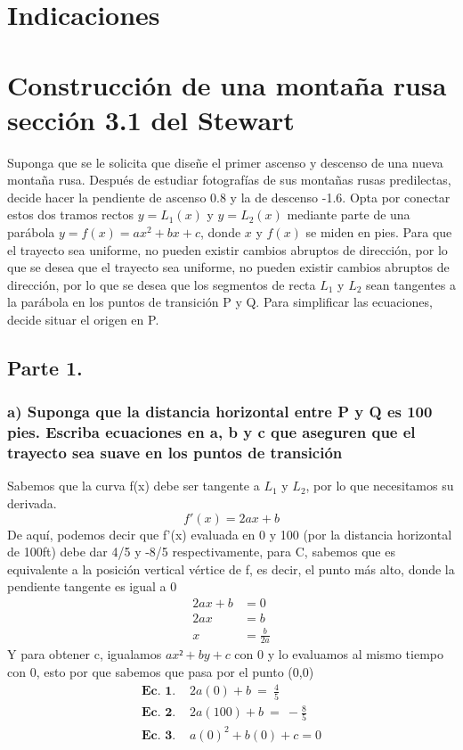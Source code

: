 \documentclass[11pt,letterpaper]{article}
\begin{document}
\section*{Indicaciones}


\section*{Construcción de una montaña rusa sección 3.1 del Stewart }
Suponga que se le solicita que diseñe el primer ascenso y descenso de una nueva montaña rusa. Después de estudiar fotografías de sus montañas rusas predilectas, decide hacer la pendiente de ascenso 0.8 y la de descenso -1.6. Opta por conectar estos dos tramos rectos $y=L_1(x)$ y $y=L_2(x)$ mediante parte de una parábola $y=f(x)=ax^2+bx+c$, donde $x$ y $f(x)$ se miden en pies. Para que el trayecto sea uniforme, no pueden existir cambios abruptos de dirección, por lo que se desea que el trayecto sea uniforme, no pueden existir cambios abruptos de dirección, por lo que se desea que los segmentos de recta $L_1$ y $L_2$ sean tangentes a la parábola en los puntos de transición P y Q.
Para simplificar las ecuaciones, decide situar el origen en P.

\subsection*{Parte 1.}
\subsubsection*{a) Suponga que la distancia horizontal entre P y Q es 100 pies. Escriba ecuaciones en a, b y c que aseguren que el trayecto sea suave en los puntos de transición}
Sabemos que la curva f(x) debe ser tangente a $L_1$ y $L_2$, por lo que necesitamos su derivada.
\begin{equation*}
  f'(x)=2ax+b
\end{equation*}
De aquí, podemos decir que f'(x) evaluada en 0 y 100 (por la distancia horizontal de 100ft) debe dar 4/5 y -8/5 respectivamente, para C, sabemos que es equivalente a la posición vertical vértice de f, es decir, el punto más alto, donde la pendiente tangente es igual a 0
\begin{equation*}
  \begin{split}
    2ax+b &= 0 \\
    2ax &= b \\
    x &= \frac{b}{2a}
  \end{split}
\end{equation*}
Y para obtener c, igualamos $ax²+by+c$ con 0 y lo evaluamos al mismo tiempo con 0, esto por que sabemos que pasa por el punto (0,0) \\
\begin{equation*}
  \begin{split}
    \textbf{Ec. 1. } & 2a(0)+b \ = \ \frac{4}{5} \\
    \textbf{Ec. 2. } & 2a(100)+b \ = \ -\frac{8}{5} \\
    \textbf{Ec. 3. } & a(0)^2+b(0)+c=0
  \end{split}
\end{equation*}
\end{document}

